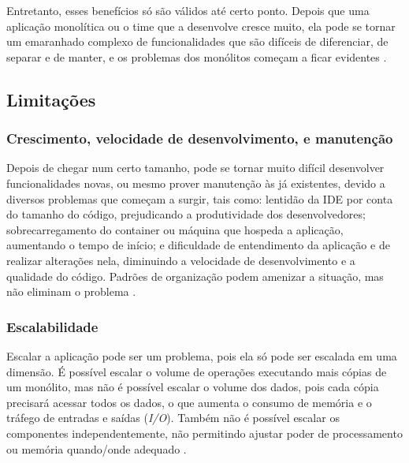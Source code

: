 Entretanto, esses benefícios só são válidos até certo ponto. Depois que uma aplicação monolítica ou o time que a desenvolve cresce muito, ela pode se tornar um emaranhado complexo de funcionalidades que são difíceis de diferenciar, de separar e de manter, e os problemas dos monólitos começam a ficar evidentes \cite{microservicesIO_monolithic_architecture}.

\subsection{Limitações}\label{subsection-monolitos-limitacoes}

\subsubsection{Crescimento, velocidade de desenvolvimento, e manutenção}
Depois de chegar num certo tamanho, pode se tornar muito difícil desenvolver funcionalidades novas, ou mesmo prover manutenção às já existentes, devido a diversos problemas que começam a surgir, tais como: lentidão da IDE por conta do tamanho do código, prejudicando a produtividade dos desenvolvedores; sobrecarregamento do container ou máquina que hospeda a aplicação, aumentando o tempo de início; e dificuldade de entendimento da aplicação e de realizar alterações nela, diminuindo a velocidade de desenvolvimento e a qualidade do código. Padrões de organização podem amenizar a situação, mas não eliminam o problema \cite{microservicesIO_monolithic_architecture}.

\subsubsection{Escalabilidade}
Escalar a aplicação pode ser um problema, pois ela só pode ser escalada em uma dimensão. É possível escalar o volume de operações executando mais cópias de um monólito, mas não é possível escalar o volume dos dados, pois cada cópia precisará acessar todos os dados, o que aumenta o consumo de memória e o tráfego de entradas e saídas (\emph{I/O}). Também não é possível escalar os componentes independentemente, não permitindo ajustar poder de processamento ou memória quando/onde adequado \cite{microservicesIO_monolithic_architecture}.


